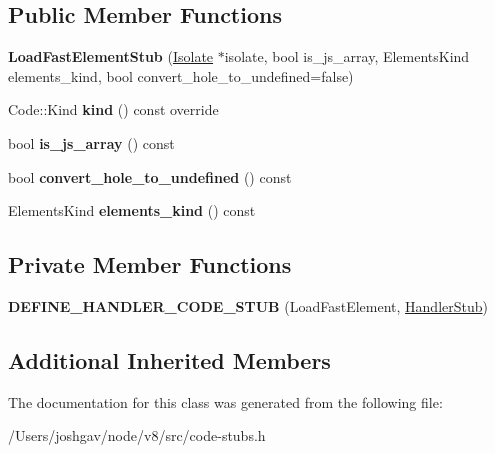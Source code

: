 \subsection*{Public Member Functions}
\begin{DoxyCompactItemize}
\item 
{\bfseries Load\+Fast\+Element\+Stub} (\hyperlink{classv8_1_1internal_1_1_isolate}{Isolate} $\ast$isolate, bool is\+\_\+js\+\_\+array, Elements\+Kind elements\+\_\+kind, bool convert\+\_\+hole\+\_\+to\+\_\+undefined=false)\hypertarget{classv8_1_1internal_1_1_load_fast_element_stub_a5f3f649e072a468de541e0a11881d07a}{}\label{classv8_1_1internal_1_1_load_fast_element_stub_a5f3f649e072a468de541e0a11881d07a}

\item 
Code\+::\+Kind {\bfseries kind} () const  override\hypertarget{classv8_1_1internal_1_1_load_fast_element_stub_abc7563e36d87b6d891c3a06d5f5ed9b9}{}\label{classv8_1_1internal_1_1_load_fast_element_stub_abc7563e36d87b6d891c3a06d5f5ed9b9}

\item 
bool {\bfseries is\+\_\+js\+\_\+array} () const \hypertarget{classv8_1_1internal_1_1_load_fast_element_stub_a1640f31d40de468f196d608f8d28e075}{}\label{classv8_1_1internal_1_1_load_fast_element_stub_a1640f31d40de468f196d608f8d28e075}

\item 
bool {\bfseries convert\+\_\+hole\+\_\+to\+\_\+undefined} () const \hypertarget{classv8_1_1internal_1_1_load_fast_element_stub_aa3062f6752e2e1025f8538d52bc75ab9}{}\label{classv8_1_1internal_1_1_load_fast_element_stub_aa3062f6752e2e1025f8538d52bc75ab9}

\item 
Elements\+Kind {\bfseries elements\+\_\+kind} () const \hypertarget{classv8_1_1internal_1_1_load_fast_element_stub_a17070f8615e939a61c268904fac286b8}{}\label{classv8_1_1internal_1_1_load_fast_element_stub_a17070f8615e939a61c268904fac286b8}

\end{DoxyCompactItemize}
\subsection*{Private Member Functions}
\begin{DoxyCompactItemize}
\item 
{\bfseries D\+E\+F\+I\+N\+E\+\_\+\+H\+A\+N\+D\+L\+E\+R\+\_\+\+C\+O\+D\+E\+\_\+\+S\+T\+UB} (Load\+Fast\+Element, \hyperlink{classv8_1_1internal_1_1_handler_stub}{Handler\+Stub})\hypertarget{classv8_1_1internal_1_1_load_fast_element_stub_a2792a8b12bef3e7761e420fb86729168}{}\label{classv8_1_1internal_1_1_load_fast_element_stub_a2792a8b12bef3e7761e420fb86729168}

\end{DoxyCompactItemize}
\subsection*{Additional Inherited Members}


The documentation for this class was generated from the following file\+:\begin{DoxyCompactItemize}
\item 
/\+Users/joshgav/node/v8/src/code-\/stubs.\+h\end{DoxyCompactItemize}
